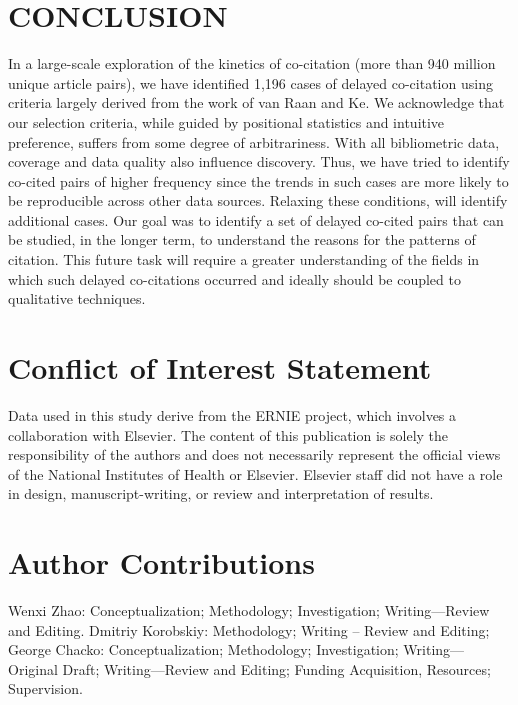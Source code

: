 \documentclass[11pt, oneside]{article}   	%
\begin{document}
\section{CONCLUSION} In a large-scale exploration of the kinetics of co-citation (more than 940 million unique article pairs), we have identified 1,196 cases of delayed co-citation using criteria largely derived from the work of van Raan and Ke. We acknowledge that our selection criteria, while guided by positional statistics and intuitive preference, suffers from some degree of arbitrariness.  With all bibliometric data, coverage and data quality also influence discovery. Thus, we have tried to identify co-cited pairs of higher frequency since the trends in such cases are more likely to be reproducible across other data sources. Relaxing these conditions, will identify additional cases. Our goal was to identify a set of delayed co-cited pairs that can be studied, in the longer term, to understand the reasons for the patterns of citation. This future task will require a greater understanding of the fields in which such delayed co-citations occurred and ideally should be coupled to qualitative techniques. 

\section*{Conflict of Interest Statement}
Data used in this study derive from the ERNIE project, which involves a collaboration with Elsevier. The content of this publication is solely the responsibility of the authors and does not necessarily represent the official views of the National Institutes of Health or Elsevier.  Elsevier staff did not have a role in design, manuscript-writing, or review and interpretation of results.

\section*{Author Contributions}

Wenxi Zhao: Conceptualization; Methodology; Investigation; Writing—Review and Editing. Dmitriy Korobskiy: Methodology; Writing – Review and Editing; George Chacko: Conceptualization; Methodology; Investigation; Writing—Original Draft; Writing—Review and Editing; Funding Acquisition, Resources; Supervision.
\end{document}

